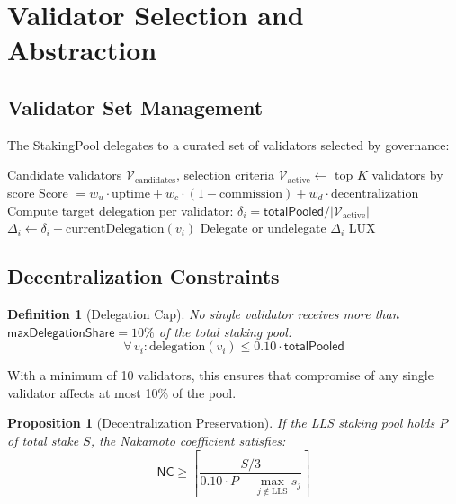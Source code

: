 \documentclass[11pt,a4paper]{article}
\newtheorem{proposition}[theorem]{Proposition}
\newtheorem{definition}{Definition}
\begin{document}
\section{Validator Selection and Abstraction}\label{sec:validators}

\subsection{Validator Set Management}

The StakingPool delegates to a curated set of validators selected by governance:

\begin{algorithm}[H]
\caption{Validator Selection and Rebalancing}
\label{alg:validator}
\begin{algorithmic}[1]
\Require Candidate validators $\mathcal{V}_{\text{candidates}}$, selection criteria
\State $\mathcal{V}_{\text{active}} \gets$ top $K$ validators by score
\State Score $= w_u \cdot \text{uptime} + w_c \cdot (1 - \text{commission}) + w_d \cdot \text{decentralization}$
    \State Compute target delegation per validator: $\delta_i = \mathsf{totalPooled} / |\mathcal{V}_{\text{active}}|$
        \State $\Delta_i \gets \delta_i - \text{currentDelegation}(v_i)$
            \State Delegate or undelegate $\Delta_i$ LUX
        \EndIf
    \EndFor
\EndFor
\end{algorithmic}
\end{algorithm}

\subsection{Decentralization Constraints}

\begin{definition}[Delegation Cap]
No single validator receives more than $\mathsf{maxDelegationShare} = 10\%$ of the total staking pool:
\begin{equation}
    \forall\, v_i : \text{delegation}(v_i) \leq 0.10 \cdot \mathsf{totalPooled}
\end{equation}
\end{definition}

With a minimum of 10 validators, this ensures that compromise of any single validator affects at most 10\% of the pool.

\begin{proposition}[Decentralization Preservation]
If the LLS staking pool holds $P$ of total stake $S$, the Nakamoto coefficient satisfies:
\begin{equation}
    \mathsf{NC} \geq \left\lceil \frac{S/3}{0.10 \cdot P + \max_{j \notin \text{LLS}} s_j} \right\rceil
\end{equation}
\end{proposition}
\end{document}
